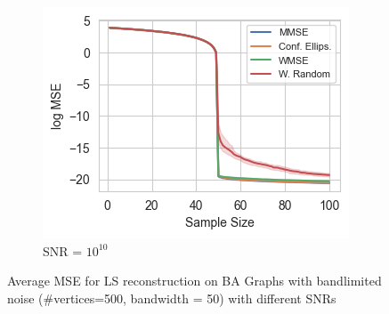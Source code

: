 \begin{figure}
\begin{subfigure}{0.3\columnwidth}
    \end{subfigure}\hfill%
    \begin{subfigure}{0.3\columnwidth}
    \includegraphics[width=\columnwidth]{figures/proj1/LS_MSE_bl_old/BA_3_500_bandwidth_50_SNRdbs_100.0_samps_100_MSE_LS.png}
    \caption{SNR = $10^{10}$}%
    \label{bandlimited_BA_MSE_subfigc}%
    \end{subfigure}%
    \caption{\color{black}Average MSE for LS reconstruction on BA Graphs with bandlimited noise (\#vertices=500, bandwidth = 50) with different SNRs}
\label{LS_BA_MSE_bandlimited_fig}
\end{figure}

